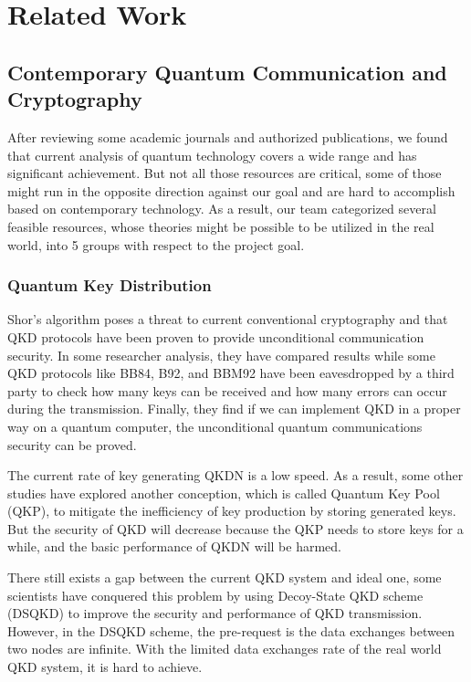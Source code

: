\documentclass[sigconf]{acmart}
\begin{document}
\section{Related Work}
\subsection{Contemporary Quantum Communication and Cryptography}
After reviewing some academic journals and authorized publications, we found that current analysis of quantum technology covers a wide range and has significant achievement. But not all those resources are critical, some of those might run in the opposite direction against our goal and are hard to accomplish based on contemporary technology. As a result, our team categorized several feasible resources, whose theories might be possible to be utilized in the real world, into 5 groups with respect to the project goal.

\subsubsection{Quantum Key Distribution}
Shor's algorithm poses a threat to current conventional cryptography and that QKD protocols have been proven to provide unconditional communication security. In some researcher analysis, they have compared results while some QKD protocols like BB84, B92, and BBM92 have been eavesdropped by a third party to check how many keys can be received and how many errors can occur during the transmission. Finally, they find if we can implement QKD in a proper way on a quantum computer, the unconditional quantum communications security can be proved\cite{nurhadi_quantum_2018}.

The current rate of key generating QKDN is a low speed. As a result, some other studies have explored another conception, which is called Quantum Key Pool (QKP), to mitigate the inefficiency of key production by storing generated keys. But the security of QKD will decrease because the QKP needs to store keys for a while, and the basic performance of QKDN will be harmed\cite{liu_multi-path_2019}.

There still exists a gap between the current QKD system and ideal one, some scientists have conquered this problem by using Decoy-State QKD scheme (DSQKD) to improve the security and performance of QKD transmission. However, in the DSQKD scheme, the pre-request is the data exchanges between two nodes are infinite. With the limited data exchanges rate of the real world QKD system, it is hard to achieve\cite{yu_study_2020}.
\end{document}
